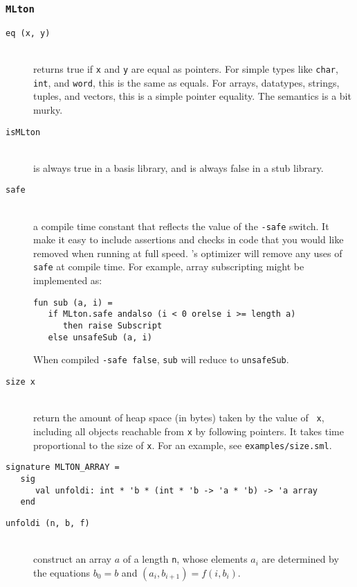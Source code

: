 \subsubsection{{\tt MLton}}

\newcommand{\entry}[1]{\item[\tt #1]\hspace{1in}\\}
\begin{description}

\entry{eq (x, y)}
returns true if {\tt x} and {\tt y} are equal as pointers.  For simple
types like {\tt char}, {\tt int}, and {\tt word}, this is the same as
equals.  For arrays, datatypes, strings, tuples, and vectors, this is
a simple pointer equality.  The semantics is a bit murky.

\entry{isMLton}
is always true in a {\mlton} basis library, and is always false in a stub
library.

\entry{safe}
a compile time constant that reflects the value of the {\tt -safe}
switch.  It make it easy to include assertions and checks in code that
you would like removed when running at full speed.  {\mlton}'s
optimizer will remove any uses of {\tt safe} at compile time.  For
example, array subscripting might be implemented as:
\begin{verbatim}
fun sub (a, i) =
   if MLton.safe andalso (i < 0 orelse i >= length a)
      then raise Subscript
   else unsafeSub (a, i)
\end{verbatim}
When compiled {\tt -safe false}, {\tt sub} will reduce to
{\tt unsafeSub}.

\entry{size x}
return the amount of heap space (in bytes) taken by the value of {\tt
x}, including all objects reachable from {\tt x} by following
pointers.  It takes time proportional to the size of {\tt x}.  For an
example, see {\tt examples/size.sml}.

\end{description}


\begin{verbatim}
signature MLTON_ARRAY =
   sig
      val unfoldi: int * 'b * (int * 'b -> 'a * 'b) -> 'a array
   end
\end{verbatim}

\begin{description}

\entry{unfoldi (n, b, f)}
construct an array $a$ of a length {\tt n}, whose elements $a_i$ are determined
by the equations $b_0 = b$ and $(a_i, b_{i+1}) = f (i, b_i)$.

\end{description}
%

